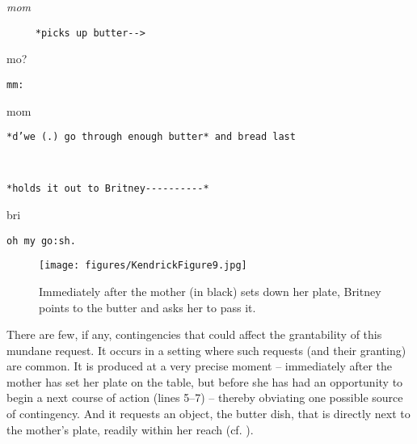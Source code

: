\documentclass[output=paper,nonflat,modfont,draft]{langsci/langscibook}
\begin{document}

\begin{mdframedkendrick}[style=secondfoc]
\begin{transbox}{11}{\textit{mom}}
\begin{verbatim}
     *picks up butter-->
\end{verbatim}
\end{transbox}
\end{mdframedkendrick}\vspace{-5mm}

\begin{transbox}{12}{mo?}
\begin{verbatim}
mm:
\end{verbatim}
\end{transbox}


\begin{transbox}{14}{mom} %
\begin{verbatim}
*d’we (.) go through enough butter* and bread last
\end{verbatim}
\end{transbox}

\begin{transbox}{15}{~}
\begin{verbatim}
*holds it out to Britney----------*
\end{verbatim}
\end{transbox}%


\begin{transbox}{17}{bri}
\begin{verbatim}
oh my go:sh.
\end{verbatim}
\end{transbox}\bigskip

\begin{figure}
\caption{Immediately after the mother (in black) sets down her plate, Britney points to the butter and asks her to pass it.}
\texttt{[image: figures/KendrickFigure9.jpg]}
\end{figure}

There are few, if any, contingencies that could affect the grantability of this mundane request. It occurs in a setting where such requests (and their granting) are common. It is produced at a very precise moment -- immediately after the mother has set her plate on the table, but before she has had an opportunity to begin a next course of action (lines 5--7) -- thereby obviating one possible source of contingency. And it requests an object, the butter dish, that is directly next to the mother’s plate, readily within her reach (cf. \citealt{KeisanenRauniomaa2012}).
\end{document}
